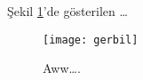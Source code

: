 \documentclass{article}
\begin{document}
Şekil \ref{fig:gerbil}'de gösterilen \ldots

\begin{figure}
\centering
\texttt{[image: gerbil]}
\caption{\label{fig:gerbil}Aww\ldots.}
\end{figure}
\end{document}
